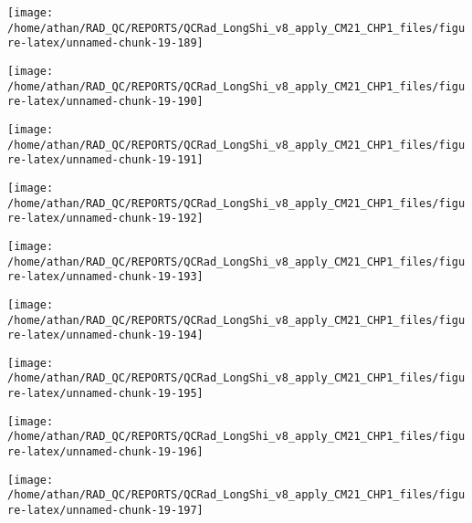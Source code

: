\documentclass[
  10pt,
  a4paper,oneside]{article}
\begin{document}
\begin{center}\texttt{[image: /home/athan/RAD\_QC/REPORTS/QCRad\_LongShi\_v8\_apply\_CM21\_CHP1\_files/figure-latex/unnamed-chunk-19-189]} \end{center}

\begin{center}\texttt{[image: /home/athan/RAD\_QC/REPORTS/QCRad\_LongShi\_v8\_apply\_CM21\_CHP1\_files/figure-latex/unnamed-chunk-19-190]} \end{center}

\begin{center}\texttt{[image: /home/athan/RAD\_QC/REPORTS/QCRad\_LongShi\_v8\_apply\_CM21\_CHP1\_files/figure-latex/unnamed-chunk-19-191]} \end{center}

\begin{center}\texttt{[image: /home/athan/RAD\_QC/REPORTS/QCRad\_LongShi\_v8\_apply\_CM21\_CHP1\_files/figure-latex/unnamed-chunk-19-192]} \end{center}

\begin{center}\texttt{[image: /home/athan/RAD\_QC/REPORTS/QCRad\_LongShi\_v8\_apply\_CM21\_CHP1\_files/figure-latex/unnamed-chunk-19-193]} \end{center}

\begin{center}\texttt{[image: /home/athan/RAD\_QC/REPORTS/QCRad\_LongShi\_v8\_apply\_CM21\_CHP1\_files/figure-latex/unnamed-chunk-19-194]} \end{center}

\begin{center}\texttt{[image: /home/athan/RAD\_QC/REPORTS/QCRad\_LongShi\_v8\_apply\_CM21\_CHP1\_files/figure-latex/unnamed-chunk-19-195]} \end{center}

\begin{center}\texttt{[image: /home/athan/RAD\_QC/REPORTS/QCRad\_LongShi\_v8\_apply\_CM21\_CHP1\_files/figure-latex/unnamed-chunk-19-196]} \end{center}

\begin{center}\texttt{[image: /home/athan/RAD\_QC/REPORTS/QCRad\_LongShi\_v8\_apply\_CM21\_CHP1\_files/figure-latex/unnamed-chunk-19-197]} \end{center}
\end{document}
